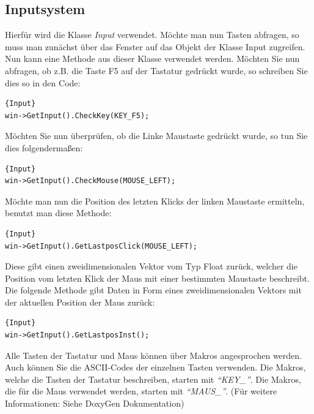 \subsection{Inputsystem}
\label{inputsystemver}
Hierfür wird die Klasse \textit{Input} verwendet. Möchte man nun Tasten abfragen, so muss man zunächst über das Fenster auf das Objekt der Klasse Input zugreifen. 
Nun kann eine Methode aus dieser Klasse verwendet werden.
Möchten Sie nun abfragen, ob z.B. die Taste F5 auf der Tastatur gedrückt wurde, so schreiben Sie dies so in den Code:
\begin{lstlisting}{Input}
win->GetInput().CheckKey(KEY_F5);
\end{lstlisting}
Möchten Sie nun überprüfen, ob die Linke Maustaste gedrückt wurde, so tun Sie dies folgendermaßen:
\begin{lstlisting}{Input}
win->GetInput().CheckMouse(MOUSE_LEFT);
\end{lstlisting}

Möchte man nun die Position des letzten Klicks der linken Maustaste ermitteln, benutzt man diese Methode:
\begin{lstlisting}{Input}
win->GetInput().GetLastposClick(MOUSE_LEFT);
\end{lstlisting}
Diese gibt einen zweidimensionalen Vektor vom Typ Float zurück, welcher die Position vom letzten Klick der Maus mit einer bestimmten Maustaste beschreibt. 
Die folgende Methode gibt Daten in Form eines zweidimensionalen Vektors mit der aktuellen Position der Maus zurück:
\begin{lstlisting}{Input}
win->GetInput().GetLastposInst();
\end{lstlisting}

Alle Tasten der Tastatur und Maus können über Makros angesprochen werden. Auch können Sie die ASCII-Codes der einzelnen Tasten verwenden. Die Makros, welche die Tasten der Tastatur beschreiben, starten mit \textit{"`KEY\_"'}. Die Makros, die für die Maus verwendet werden, starten mit \textit{"`MAUS\_"'}.
(Für weitere Informationen: Siehe DoxyGen Dokumentation)